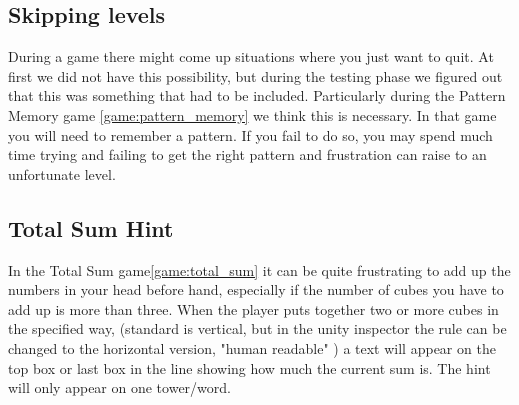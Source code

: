 \subsection{Skipping levels}
During a game there might come up situations where you just want to quit. At
first we did not have this possibility, but during the testing phase we figured
out that this was something that had to be included. Particularly during the
Pattern Memory game \ref{game:pattern_memory} we think this is necessary. In
that game you will need to remember a pattern. If you fail to do so, you may
spend much time trying and failing to get the right pattern and frustration can
raise to an unfortunate level. 

\subsection{Total Sum Hint}
In the Total Sum game\ref{game:total_sum} it can be quite frustrating to add up the numbers in your head before hand, especially if the number of cubes you have to add up is more than three. When the player puts together two or more cubes in the specified way, (standard is vertical, but in the unity inspector the rule can be changed to the horizontal version, "human readable" ) a text will appear on the top box or last box in the line showing how much the current sum is. The hint will only appear on one tower/word.


